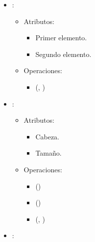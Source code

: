 \documentclass[11pt]{article}
\begin{document}
   \begin{itemize}
      \item {}:
      \begin{itemize}
         \item Atributos:

         \begin{itemize}
            \item Primer elemento.
            \item Segundo elemento.
         \end{itemize}
      \end{itemize}
      
      \pagebreak
      \begin{itemize}
         \item Operaciones:

         \begin{itemize}
            \item {}(, )
         \end{itemize}
      \end{itemize}

      \item {}:

      \begin{itemize}
         \item Atributos:

         \begin{itemize}
            \item Cabeza.
            \item Tamaño.
         \end{itemize}
      \end{itemize}

      \begin{itemize}
         \item Operaciones:

         \begin{itemize}
            \item {}()
            \item {}()
            \item {}(, )
         \end{itemize}
      \end{itemize}

      \item {}:
      

\end{itemize}
\end{document}
